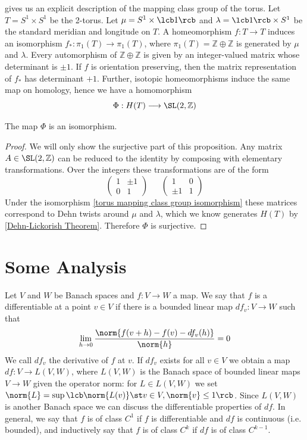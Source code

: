  gives us an explicit description of the mapping class group of the torus. Let $T = S^1 \times S^1$ be the 2-torus. Let $\mu = S^1 \times \lcb 1 \rcb$ and $\lambda = \lcb 1 \rcb \times S^1$ be the standard meridian and longitude on $T$. A homeomorphism $f : T \rightarrow T$ induces an isomorphism $f_* : \pi_1(T) \rightarrow \pi_1(T)$, where $\pi_1(T) = \mathbb Z \oplus \mathbb Z$ is generated by $\mu$ and $\lambda$. Every automorphism of $\mathbb Z \oplus \mathbb Z$ is given by an integer-valued matrix whose determinant is $\pm 1$. If $f$ is orientation preserving, then the matrix representation of $f_*$ has determinant $+1$. Further, isotopic homeomorphisms induce the same map on homology, hence we have a homomorphism
\begin{equation}
\label{torus mapping class group isomorphism}
\Phi : H(T) \longrightarrow \SL(2,\mathbb Z)
\end{equation}
\begin{prop}
The map $\Phi$ is an isomorphism.
\end{prop}
\begin{proof}
We will only show the surjective part of this proposition. Any matrix $A \in \SL(2,\mathbb Z)$ can be reduced to the identity by composing with elementary transformations. Over the integers these transformations are of the form
\[ \begin{pmatrix} 1 & \pm 1 \\ 0 & 1 \end{pmatrix} \ \ \ \ \ \ \ \begin{pmatrix} 1 & 0 \\ \pm 1 & 1 \end{pmatrix} \]
Under the isomorphism \eqref{torus mapping class group isomorphism} these matrices correspond to Dehn twists around $\mu$ and $\lambda$, which we know generates $H(T)$ by \cref{Dehn-Lickorish Theorem}. Therefore $\Phi$ is surjective.
\end{proof}






\newpage
\section{Some Analysis}
\label{Some Analysis}


Let $V$ and $W$ be Banach spaces and $f : V \rightarrow W$ a map. We say that $f$ is a differentiable at a point $v \in V$ if there is a bounded linear map $df_v : V \rightarrow W$ such that
\[ \lim_{h \to 0} \frac{ \norm{f(v+h)-f(v)-df_v(h)} }{ \norm{h} } = 0 \]
We call $df_v$ the derivative of $f$ at $v$. If $df_v$ exists for all $v \in V$ we obtain a map $df : V \rightarrow L(V,W)$, where $L(V,W)$ is the Banach space of bounded linear maps $V \rightarrow W$ given the operator norm: for $L \in L(V,W)$ we set $\norm{L} = \sup \lcb \norm{L(v)} \st v \in V, \norm{v} \leq 1 \rcb$. Since $L(V,W)$ is another Banach space we can discuss the differentiable properties of $df$. In general, we say that $f$ is of class $C^1$ if $f$ is differentiable and $df$ is continuous (i.e. bounded), and inductively say that $f$ is of class $C^k$ if $df$ is of class $C^{k-1}$. 

